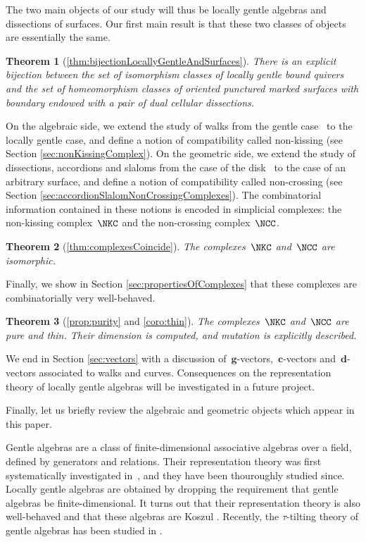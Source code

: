 \documentclass{amsart}
\newtheorem*{theorem*}{Theorem}%
\theoremstyle{definition}
\renewcommand{\b}[1]{\mathbf{#1}} %
\begin{document}
The two main objects of our study will thus be locally gentle algebras and dissections of surfaces.
Our first main result is that these two classes of objects are essentially the same.

\begin{theorem*}[\ref{thm:bijectionLocallyGentleAndSurfaces}]
There is an explicit bijection between the set of isomorphism classes of locally gentle bound quivers and the set of homeomorphism classes of oriented punctured marked surfaces with boundary endowed with a pair of dual cellular dissections.
\end{theorem*}

On the algebraic side, we extend the study of walks from the gentle case~\cite{McConville, PaluPilaudPlamondon} to the locally gentle case, and define a notion of compatibility called non-kissing (see Section \ref{sec:nonKissingComplex}).
On the geometric side, we extend the study of dissections, accordions and slaloms from the case of the disk~\cite{GarverMcConville, MannevillePilaud-accordion} to the case of an arbitrary surface, and define a notion of compatibility called non-crossing (see Section \ref{sec:accordionSlalomNonCrossingComplexes}).
The combinatorial information contained in these notions is encoded in simplicial complexes: the non-kissing complex~$\NKC$ and the non-crossing complex~$\NCC$.

\begin{theorem*}[\ref{thm:complexesCoincide}]
The complexes~$\NKC$ and~$\NCC$ are isomorphic.
\end{theorem*}

Finally, we show in Section \ref{sec:propertiesOfComplexes} that these complexes are combinatorially very well-behaved.

\begin{theorem*}[\ref{prop:purity} and \ref{coro:thin}]
The complexes~$\NKC$ and~$\NCC$ are pure and thin.  Their dimension is computed, and mutation is explicitly described.
\end{theorem*}

We end in Section \ref{sec:vectors} with a discussion of~$\b{g}$-vectors,~$\b{c}$-vectors and~$\b{d}$-vectors associated to walks and curves.
Consequences on the representation theory of locally gentle algebras will be investigated in a future project.

Finally, let us briefly review the algebraic and geometric objects which appear in this paper.

Gentle algebras are a class of finite-dimensional associative algebras over a field, defined by generators and relations.
Their representation theory was first systematically investigated in~\cite{ButlerRingel}, and they have been thouroughly studied since.
Locally gentle algebras are obtained by dropping the requirement that gentle algebras be finite-dimensional.
It turns out that their representation theory is also well-behaved \cite{Crawley-Boevey} and that these algebras are Koszul \cite{BessenrodtHolm}.
Recently, the $\tau$-tilting theory \cite{AdachiIyamaReiten} of gentle algebras has been studied in \cite{PaluPilaudPlamondon, BrustleDouvilleMousavandThomasYildirim}.
\end{document}
